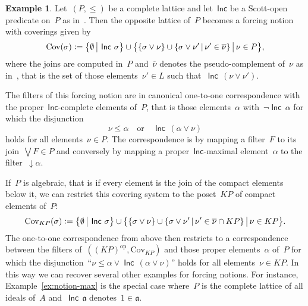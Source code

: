 \documentclass[com,11pt,crcready]{iosart2x}
\theoremstyle{definition}
\newtheorem{example}[definition]{Example}
\theoremstyle{plain}
\theoremstyle{remark}
\newcommand{\Incbare}{\mathsf{Inc}}
\newcommand{\Inc}[1]{\operatorname{\Incbare}\,#1}
\newcommand{\?}{\,{:}\,}
\newcommand{\aaa}{\mathfrak{a}}
\newcommand{\defeq}{\vcentcolon=}
\newcommand{\Cov}{\mathrm{Cov}}
\renewcommand{\_}{\mathpunct{.}\,}
\begin{document}
\begin{example}\label{ex:notion-scott}Let~$(P,{\leq})$ be a complete lattice and let~$\Incbare$
be a Scott-open predicate on~$P$ as in~\cite{wessel-schuster:radical}. Then the
opposite lattice of~$P$ becomes a forcing notion with coverings given by
\[
  \Cov(\sigma) \defeq \bigl\{ \emptyset \,\big|\, \Inc{\sigma} \bigr\} \cup
    \bigl\{ \{ \sigma \vee \nu \} \cup \{ \sigma \vee \nu' \,|\, \nu' \in
    \overline{\nu} \} \,\big|\, \nu \in P \bigr\},
\]
where the joins are computed in~$P$ and~$\overline{\nu}$ denotes the pseudo-complement of~$\nu$ as
in~\cite[Equation~(6)]{wessel-schuster:radical}, that is the set of those
elements~$\nu' \in L$ such that~$\Inc{(\nu \vee \nu')}$.

The filters of this forcing notion are in canonical one-to-one correspondence with
the proper~$\Incbare$-complete elements of~$P$, that is those elements~$\alpha$
with~$\neg \Inc{\alpha}$ for which the disjunction
\[ \nu \leq \alpha \quad\text{or}\quad \Inc{(\alpha \vee \nu)} \]
holds for all elements~$\nu \in P$. The correspondence is by mapping a
filter~$F$ to its join~$\bigvee F \in P$ and conversely by mapping
a proper~$\Incbare$-maximal element~$\alpha$ to the filter~${\downarrow}\alpha$.

If~$P$ is algebraic, that is if every element is the join of the compact
elements below it, we can restrict this covering system to the poset~$KP$ of
compact elements of~$P$:
\[
  \Cov_{KP}(\sigma) \defeq \bigl\{ \emptyset \,\big|\, \Inc{\sigma} \bigr\} \cup
    \bigl\{ \{ \sigma \vee \nu \} \cup \{ \sigma \vee \nu' \,|\, \nu' \in
    \overline{\nu} \cap KP \} \,\big|\, \nu \in KP \bigr\}.
\]
The one-to-one correspondence from above then restricts to a correspondence
between the filters of~$((KP)^\mathrm{op},\mathrm{Cov}_{KP})$ and those proper
elements~$\alpha$ of~$P$ for which the disjunction~``$\nu \leq \alpha \vee
\Inc{(\alpha \vee \nu)}$'' holds for all elements~$\nu \in KP$. In this way we can
recover several other examples for forcing notions. For instance,
Example~\ref{ex:notion-max} is the special case where~$P$ is the complete lattice
of all ideals of~$A$ and~$\Inc{\aaa}$ denotes~$1 \in \aaa$.
\end{example}
\end{document}
